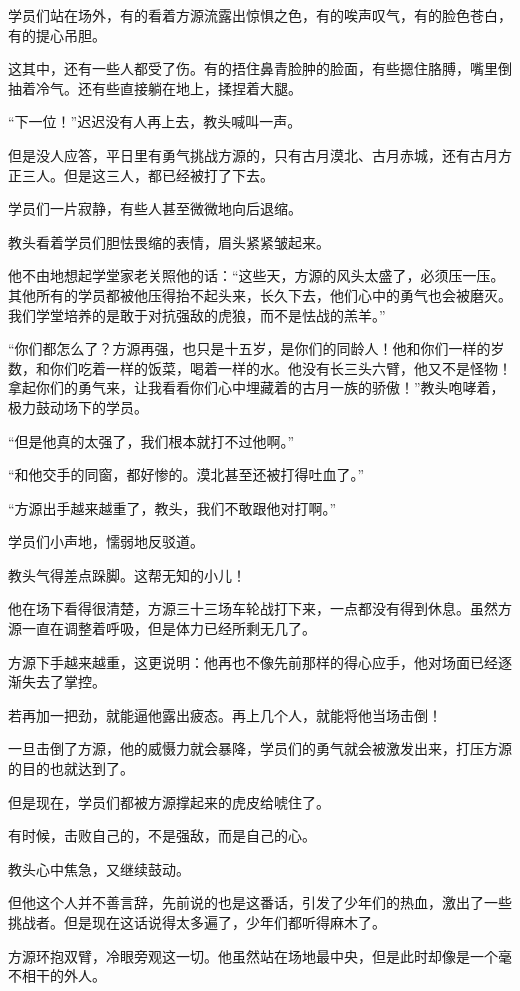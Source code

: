 \begin{this_body}
学员们站在场外，有的看着方源流露出惊惧之色，有的唉声叹气，有的脸色苍白，有的提心吊胆。

这其中，还有一些人都受了伤。有的捂住鼻青脸肿的脸面，有些摁住胳膊，嘴里倒抽着冷气。还有些直接躺在地上，揉捏着大腿。

“下一位！”迟迟没有人再上去，教头喊叫一声。

但是没人应答，平日里有勇气挑战方源的，只有古月漠北、古月赤城，还有古月方正三人。但是这三人，都已经被打了下去。

学员们一片寂静，有些人甚至微微地向后退缩。

教头看着学员们胆怯畏缩的表情，眉头紧紧皱起来。

他不由地想起学堂家老关照他的话：“这些天，方源的风头太盛了，必须压一压。其他所有的学员都被他压得抬不起头来，长久下去，他们心中的勇气也会被磨灭。我们学堂培养的是敢于对抗强敌的虎狼，而不是怯战的羔羊。”

“你们都怎么了？方源再强，也只是十五岁，是你们的同龄人！他和你们一样的岁数，和你们吃着一样的饭菜，喝着一样的水。他没有长三头六臂，他又不是怪物！拿起你们的勇气来，让我看看你们心中埋藏着的古月一族的骄傲！”教头咆哮着，极力鼓动场下的学员。

“但是他真的太强了，我们根本就打不过他啊。”

“和他交手的同窗，都好惨的。漠北甚至还被打得吐血了。”

“方源出手越来越重了，教头，我们不敢跟他对打啊。”

学员们小声地，懦弱地反驳道。

教头气得差点跺脚。这帮无知的小儿！

他在场下看得很清楚，方源三十三场车轮战打下来，一点都没有得到休息。虽然方源一直在调整着呼吸，但是体力已经所剩无几了。

方源下手越来越重，这更说明：他再也不像先前那样的得心应手，他对场面已经逐渐失去了掌控。

若再加一把劲，就能逼他露出疲态。再上几个人，就能将他当场击倒！

一旦击倒了方源，他的威慑力就会暴降，学员们的勇气就会被激发出来，打压方源的目的也就达到了。

但是现在，学员们都被方源撑起来的虎皮给唬住了。

有时候，击败自己的，不是强敌，而是自己的心。

教头心中焦急，又继续鼓动。

但他这个人并不善言辞，先前说的也是这番话，引发了少年们的热血，激出了一些挑战者。但是现在这话说得太多遍了，少年们都听得麻木了。

方源环抱双臂，冷眼旁观这一切。他虽然站在场地最中央，但是此时却像是一个毫不相干的外人。


\end{this_body}
